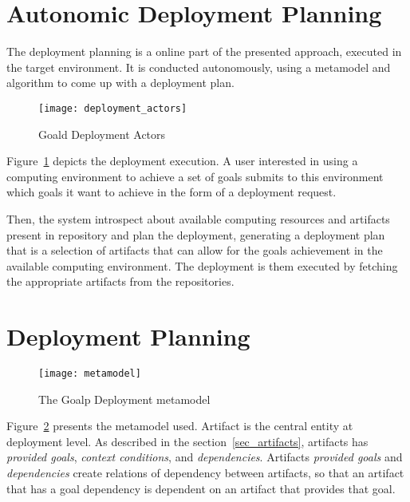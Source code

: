 \section{Autonomic Deployment Planning}
\label{sec:online}

The deployment planning is a online part of the presented approach, executed in the target environment. It is conducted autonomously, using a metamodel and algorithm to come up with a deployment plan.

\begin{figure}[!htb]
  \centering
  \texttt{[image: deployment\_actors]}
  \caption{Goald Deployment Actors}
\label{fig:deployment_actors}
\end{figure}

Figure~\ref{fig:deployment_actors} depicts the deployment execution. A user interested in using a computing environment to achieve a set of goals submits to this environment which goals it want to achieve in the form of a deployment request.

Then, the system introspect about available computing resources and artifacts present in repository and plan the deployment, generating a deployment plan that is a selection of artifacts that can allow for the goals achievement in the available computing environment. The deployment is them executed by fetching the appropriate artifacts from the repositories.


\section{Deployment Planning}
\label{sec:planning}



\begin{figure}[!htb]
  \centering
  \texttt{[image: metamodel]}
  \caption{The Goalp Deployment metamodel}
  \label{fig:metamodel}
\end{figure}

Figure~\ref{fig:metamodel} presents the metamodel used. Artifact is the central entity at deployment level. As described in the section~\ref{sec_artifacts}, artifacts has \emph{provided goals}, \emph{context conditions}, and \emph{dependencies}.
Artifacts \emph{provided goals} and \emph{dependencies} create relations of dependency between artifacts, so that an artifact that has a goal dependency is dependent on an artifact that provides that goal. %

